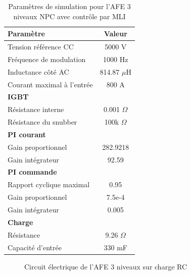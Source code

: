 \begin{table}[htb]
\centering
\begin{tabular}{|l|c|} 
  \hline
  \textbf{Paramètre} & \textbf{Valeur}  \\
  \hline\hline
  Tension référence CC & 5000 V\\ \hline
  Fréquence de modulation & 1000 Hz \\ \hline
  Inductance côté AC& 814.87 $\mu$H\\ \hline
  Courant maximal à l'entrée& 800 A \\ \hline \hline
  \multicolumn{2}{|l|}{\textbf{IGBT}}\\ \hline
  Résistance interne & 0.001 $\Omega$\\
  Résistance du snubber & 100k $\Omega$\\ \hline \hline
   \multicolumn{2}{|l|}{\textbf{PI courant}}\\ \hline
  Gain proportionnel & 282.9218 \\
  Gain intégrateur & 92.59 \\ \hline \hline
  \multicolumn{2}{|l|}{\textbf{PI commande}}\\ \hline
  Rapport cyclique maximal & 0.95\\
  Gain proportionnel & 7.5e-4 \\
  Gain intégrateur & 0.005 \\ \hline \hline
  \multicolumn{2}{|l|}{\textbf{Charge}}\\ \hline
  Résistance & 9.26 $\Omega$ \\
  Capacité d'entrée & 330 mF\\
  \hline
\end{tabular}
\caption{Paramètres de simulation pour l'AFE 3 niveaux NPC avec contrôle par MLI}
\label{p_AF_3level}
\end{table}

\begin{figure}[htb]
\caption{Circuit électrique de l'AFE 3 niveaux sur charge RC}
\label{circuit_AFE_3L_RC}
\end{figure}


